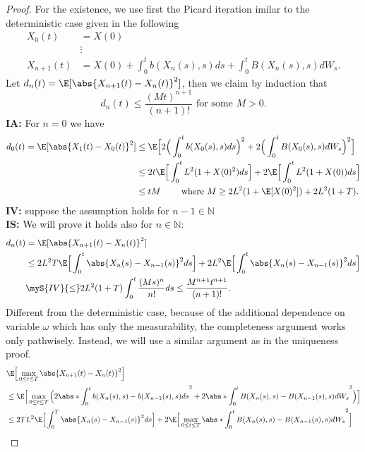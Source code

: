 \begin{proof}
 For the existence,  we use first the Picard iteration imilar to the deterministic case given in the following
 \begin{align*}
   X_{0}(t) &= X(0)  \\
           &\vdots\\
   X_{n+1}(t) &= X(0) + \int_0^{t} b(X_{n}(s),s ) ds + \int_0^{t} B(X_{n}(s),s ) dW_s   
 .\end{align*}
 Let $d_{n}(t) = \E[\abs{X_{n+1}(t)-X_{n}(t)}^2] $, then we claim by induction that 
 $$
 d_{n}(t) \le  \frac{(Mt)^{n+1} }{(n+1)!} \mbox{ for some } M>0.
 $$
  \textbf{IA:} For $n=0$ we have
  \begin{align*}
    d_0(t) = \E[\abs{X_1(t)-X_0(t)}^2] &\le  \E\Big[2 \Big(\int_0^{t} b(X_0(s),s) ds \Big)^2 + 2 \Big(\int_0^{t} B(X_0(s),s )dW_s \Big)^2\Big]  \\
                                       &\le  2t \E\Big[\int_0^{t} L^2(1+X(0)^2) ds \Big] + 2\E\Big[\int_0^{t} L^2(1+X(0)) ds \Big] \\
                                       &\le  tM \qquad \text{ where } M\ge 2L^2(1+\E[X(0)^2]) +2L^2(1+T)
  .\end{align*}
  \textbf{IV:} suppose the assumption holds for $n-1 \in  \mathbb{N}$\\
  \textbf{IS:} We will prove it holds also for $n\in\mathbb{N}$: 
  \begin{align*}
    d_{n}(t) &= \E[\abs{X_{n+1}(t) - X_{n}(t) }^2] \\
    &\le  2 L^2 T \E\Big[\int_0^{t} \abs{X_{n}(s) - X_{n-1}(s)  }^2 ds \Big]  + 2L^2\E\Big[\int_0^{t} \abs{X_{n}(s) - X_{n-1}(s)  }^2  ds\Big] \\
             &\myS{IV}{\le } 2L^2(1+T) \int_0^{t} \frac{(Ms)^n}{n!} ds \le \frac{M^{n+1}t^{n+1}}{(n+1)!} 
  .\end{align*}
  Different from the deterministic case, because of the additional dependence on variable $\omega $ which has only the measurability, the completeness argument works only pathwisely. Instead, we will use a similar argument as in the uniqueness proof. 
  \begin{align*}
    &\E\Big[\max_{0\le t \le T} \abs{X_{n+1}(t) - X_{n}(t)  }^2\Big] \\
    &\le \E\Big[\max_{0\le t\le T} \Big(2\abs*{\int_0^{t} b(X_{n}(s),s )-b(X_{n-1}(s),s ) ds}^2 + 2\abs*{\int_0^{t}B(X_{n}(s),s )-B(X_{n-1}(s),s ) dW_s}^2\Big)\Big] \\
    &\le 2TL^2 \E\Big[\int_0^{T} \abs{X_{n}(s) - X_{n-1}(s)  }^2 ds \Big] + 2\E\Big[\max_{0\le t\le T} \abs*{\int_0^{t} B(X_{n}(s),s )- B(X_{n-1}(s),s ) dW_s}^2\Big]\\

\end{align*}
\end{proof}
